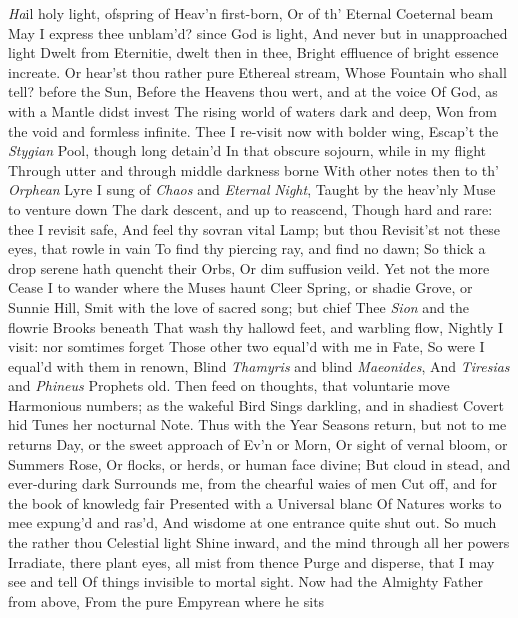 \documentclass[11pt]{book}
\newcounter {first}
\begin{document}
\Book
 
\quad \textit{Ha}il holy light, ofspring of Heav'n first-born, 
Or of th' Eternal Coeternal beam 
May I express thee unblam'd? since God is light, 
And never but in unapproached light 
Dwelt from Eternitie, dwelt then in thee, 
Bright effluence of bright essence increate. 
Or hear'st thou rather pure Ethereal stream, 
Whose Fountain who shall tell? before the Sun, 
Before the Heavens thou wert, and at the voice 
Of God, as with a Mantle didst invest 
The rising world of waters dark and deep, 
Won from the void and formless infinite. 
Thee I re-visit now with bolder wing, 
Escap't the \textit{Stygian} Pool, though long detain'd 
In that obscure sojourn, while in my flight 
Through utter and through middle darkness borne 
With other notes then to th' \textit{Orphean} Lyre 
I sung of \textit{Chaos} and \textit{Eternal} \textit{Night}, 
Taught by the heav'nly Muse to venture down 
The dark descent, and up to reascend, 
Though hard and rare: thee I revisit safe, 
And feel thy sovran vital Lamp; but thou 
Revisit'st not these eyes, that rowle in vain 
To find thy piercing ray, and find no dawn; 
So thick a drop serene hath quencht their Orbs, 
Or dim suffusion veild.  Yet not the more 
Cease I to wander where the Muses haunt 
Cleer Spring, or shadie Grove, or Sunnie Hill, 
Smit with the love of sacred song; but chief 
Thee \textit{Sion} and the flowrie Brooks beneath 
That wash thy hallowd feet, and warbling flow, 
Nightly I visit: nor somtimes forget 
Those other two equal'd with me in Fate, 
So were I equal'd with them in renown, 
Blind \textit{Thamyris} and blind \textit{Maeonides}, 
And \textit{Tiresias} and \textit{Phineus} Prophets old. 
Then feed on thoughts, that voluntarie move 
Harmonious numbers; as the wakeful Bird 
Sings darkling, and in shadiest Covert hid 
Tunes her nocturnal Note.  Thus with the Year 
Seasons return, but not to me returns 
Day, or the sweet approach of Ev'n or Morn, 
Or sight of vernal bloom, or Summers Rose, 
Or flocks, or herds, or human face divine; 
But cloud in stead, and ever-during dark 
Surrounds me, from the chearful waies of men 
Cut off, and for the book of knowledg fair 
Presented with a Universal blanc 
Of Natures works to mee expung'd and ras'd, 
And wisdome at one entrance quite shut out. 
So much the rather thou Celestial light 
Shine inward, and the mind through all her powers 
Irradiate, there plant eyes, all mist from thence 
Purge and disperse, that I may see and tell 
Of things invisible to mortal sight. 
\quad Now had the Almighty Father from above, 
From the pure Empyrean where he sits 
\end{document}
